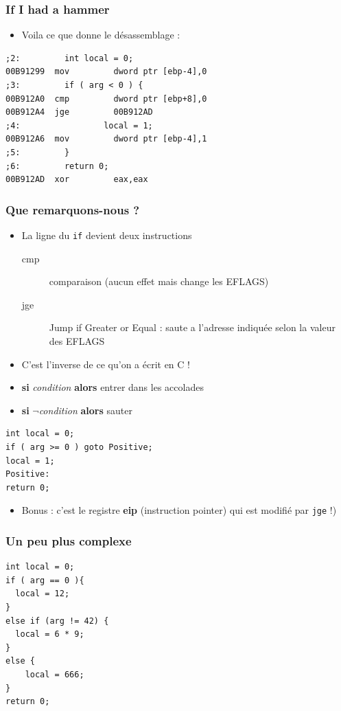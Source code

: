 \documentclass{beamer}
\begin{document}
\begin{frame}[fragile]
\frametitle{If I had a hammer}
\begin{itemize}
\item Voila ce que donne le désassemblage : 
\end{itemize}
\begin{lstlisting}[language={[x86masm]Assembler}]
;2:         int local = 0;
00B91299  mov         dword ptr [ebp-4],0  
;3:         if ( arg < 0 ) {
00B912A0  cmp         dword ptr [ebp+8],0  
00B912A4  jge         00B912AD  
;4:                 local = 1;
00B912A6  mov         dword ptr [ebp-4],1  
;5:         }
;6:         return 0;
00B912AD  xor         eax,eax  
\end{lstlisting}
\end{frame}

\begin{frame}[fragile]
\frametitle{Que remarquons-nous ?}
\begin{itemize}
\item La ligne du \lstinline+if+ devient deux instructions
\begin{description} 
\item[cmp] comparaison (aucun effet mais change les EFLAGS)
\item[jge] Jump if Greater or Equal  : saute a l'adresse indiquée selon la valeur des EFLAGS
\end{description} 
\pause
\item C'est l'inverse de ce qu'on a écrit en C !
\pause
\item \textbf{si} \textit{condition} \textbf{alors} entrer dans les accolades
\item \textbf{si} $\neg$\textit{condition} \textbf{alors} sauter 
\end{itemize}


\begin{lstlisting}
int local = 0;
if ( arg >= 0 ) goto Positive;
local = 1;
Positive:
return 0;
\end{lstlisting}
\pause
\begin{itemize}
\item Bonus : c'est le registre \textbf{eip} (instruction pointer) qui est modifié par \texttt{jge} !)
\end{itemize}
\end{frame}

\begin{frame}[fragile]
\frametitle{Un peu plus complexe}
\begin{lstlisting}
int local = 0;
if ( arg == 0 ){
  local = 12;
}
else if (arg != 42) {
  local = 6 * 9;
}
else {
	local = 666;
}
return 0;
\end{lstlisting}
\end{frame}
\end{document}
